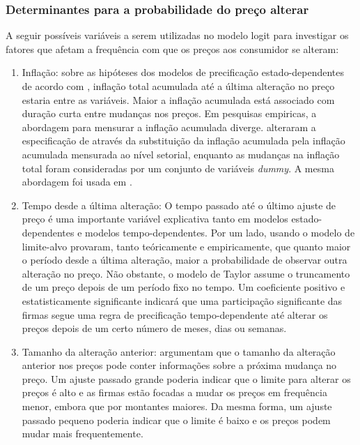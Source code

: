 \begin{algorithm}[H]
\subsubsection*{Determinantes para a probabilidade do preço alterar}

A seguir possíveis variáveis a serem utilizadas no modelo logit para investigar os fatores que afetam a frequência com que os preços aos consumidor se alteram:

\begin{enumerate}
  \item Inflação: sobre as hipóteses dos modelos de precificação estado-dependentes de acordo com \citet{cecchetti1986frequency}, inflação total acumulada até a última alteração no preço estaria entre as variáveis. Maior a inflação acumulada está associado com duração curta entre mudanças nos preços. Em pesquisas empiricas, a abordagem para mensurar a inflação acumulada diverge. \citet{aucremanne2005time} alteraram a especificação de \citet{cecchetti1986frequency} através da substituição da inflação acumulada pela inflação acumulada mensurada ao nível setorial, enquanto as mudanças na inflação total foram consideradas por um conjunto de variáveis \emph{dummy}. A mesma abordagem foi usada em \citet{baumgartner2005frequently}.
  \item Tempo desde a última alteração: O tempo passado até o último ajuste de preço é uma importante variável explicativa tanto em modelos estado-dependentes e modelos tempo-dependentes. Por um lado, usando o modelo de limite-alvo \citet{cecchetti1986frequency} provaram, tanto teóricamente e empiricamente, que quanto maior o período desde a última alteração, maior a probabilidade de observar outra alteração no preço. Não obstante, o modelo de Taylor assume o truncamento de um preço depois de um período fixo no tempo. Um coeficiente positivo e estatisticamente significante indicará que uma participação significante das firmas segue uma regra de precificação tempo-dependente até alterar os preços depois de um certo número de meses, dias ou semanas.
  \item Tamanho da alteração anterior: \citet{cecchetti1986frequency} argumentam que o tamanho da alteração anterior nos preços pode conter informações sobre a próxima mudança no preço. Um ajuste passado grande poderia indicar que o limite para alterar os preços é alto e as firmas estão focadas a mudar os preços em frequência menor, embora que por montantes maiores. Da mesma forma, um ajuste passado pequeno poderia indicar que o limite é baixo e os preços podem mudar mais frequentemente. 

\end{enumerate}
\end{algorithm}
